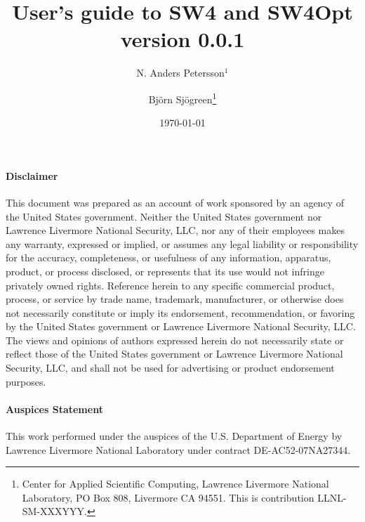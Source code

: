 \documentclass[11pt]{report}
\begin{document}
\title{\LARGE User's guide to SW4 and SW4Opt version 0.0.1} 

\author{ N. Anders Petersson$^1$ \and Bj\"orn Sj\"ogreen\thanks{Center for Applied Scientific
     Computing, Lawrence Livermore National Laboratory, PO Box 808, Livermore CA 94551. This is
     contribution LLNL-SM-XXXYYY.}}
\date{\today} 
\maketitle
\pagestyle{myheadings}


\pagebreak
\paragraph {Disclaimer} 
This document was prepared as an account of work sponsored by an agency of the United States
government. Neither the United States government nor Lawrence Livermore National Security, LLC, nor
any of their employees makes any warranty, expressed or implied, or assumes any legal liability or
responsibility for the accuracy, completeness, or usefulness of any information, apparatus, product,
or process disclosed, or represents that its use would not infringe privately owned
rights. Reference herein to any specific commercial product, process, or service by trade name,
trademark, manufacturer, or otherwise does not necessarily constitute or imply its endorsement,
recommendation, or favoring by the United States government or Lawrence Livermore National Security,
LLC. The views and opinions of authors expressed herein do not necessarily state or reflect those of
the United States government or Lawrence Livermore National Security, LLC, and shall not be used for
advertising or product endorsement purposes. 

\paragraph{Auspices Statement}
This work performed under the auspices of the U.S. Department of Energy by Lawrence Livermore
National Laboratory under contract DE-AC52-07NA27344.
\tableofcontents

\end{document}
